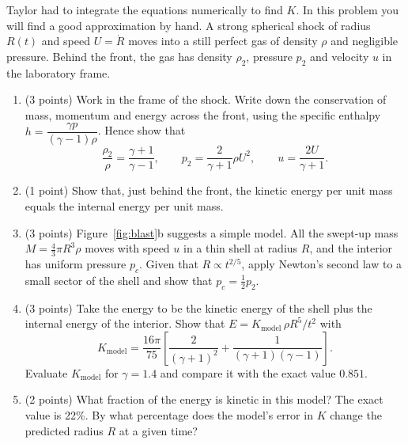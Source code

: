 \documentclass[11pt,a4paper]{article}
\begin{document}
Taylor had to integrate the equations numerically to find $K$. In this problem you will find a good approximation by hand. A strong spherical shock of radius $R(t)$ and speed $U=\dot R$ moves into a still perfect gas of density $\rho$ and negligible pressure. Behind the front, the gas has density $\rho_2$, pressure $p_2$ and velocity $u$ in the laboratory frame.
\begin{enumerate}[label=\textbf{\Alph*.}]
  \item (3 points) Work in the frame of the shock. Write down the conservation of mass, momentum and energy across the front, using the specific enthalpy $h=\dfrac{\gamma p}{(\gamma-1)\rho}$. Hence show that
  \[\frac{\rho_2}{\rho}=\frac{\gamma+1}{\gamma-1},\qquad p_2=\frac{2}{\gamma+1}\rho U^2,\qquad u=\frac{2U}{\gamma+1}.\]
  \item (1 point) Show that, just behind the front, the kinetic energy per unit mass equals the internal energy per unit mass.
  \item (3 points) Figure~\ref{fig:blast}b suggests a simple model. All the swept-up mass $M=\frac43\pi R^3\rho$ moves with speed $u$ in a thin shell at radius $R$, and the interior has uniform pressure $p_c$. Given that $R\propto t^{2/5}$, apply Newton's second law to a small sector of the shell and show that $p_c=\frac12p_2$.
  \item (3 points) Take the energy to be the kinetic energy of the shell plus the internal energy of the interior. Show that $E=K_{\text{model}}\,\rho R^5/t^2$ with
  \[K_{\text{model}}=\frac{16\pi}{75}\left[\frac{2}{(\gamma+1)^2}+\frac{1}{(\gamma+1)(\gamma-1)}\right].\]
  Evaluate $K_{\text{model}}$ for $\gamma=1.4$ and compare it with the exact value $0.851$.
  \item (2 points) What fraction of the energy is kinetic in this model? The exact value is 22\%. By what percentage does the model's error in $K$ change the predicted radius $R$ at a given time?
\end{enumerate}
\end{document}
